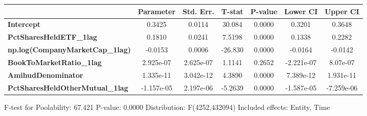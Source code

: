 \begin{center}
\begin{tabular}{lclc}
\bottomrule
\end{tabular}
\begin{tabular}{lcccccc}
                                        & \textbf{Parameter} & \textbf{Std. Err.} & \textbf{T-stat} & \textbf{P-value} & \textbf{Lower CI} & \textbf{Upper CI}  \\
\midrule
\textbf{Intercept}                      &       0.3425       &       0.0114       &      30.084     &      0.0000      &       0.3201      &       0.3648       \\
\textbf{PctSharesHeldETF\_1lag}         &       0.1810       &       0.0241       &      7.5198     &      0.0000      &       0.1338      &       0.2282       \\
\textbf{np.log(CompanyMarketCap\_1lag)} &      -0.0153       &       0.0006       &     -26.830     &      0.0000      &      -0.0164      &      -0.0142       \\
\textbf{BookToMarketRatio\_1lag}        &     2.925e-07      &     2.625e-07      &      1.1141     &      0.2652      &     -2.221e-07    &      8.07e-07      \\
\textbf{AmihudDenominator}              &     1.335e-11      &     3.042e-12      &      4.3890     &      0.0000      &     7.389e-12     &     1.931e-11      \\
\textbf{PctSharesHeldOtherMutual\_1lag} &     -1.157e-05     &     2.197e-06      &     -5.2639     &      0.0000      &     -1.587e-05    &     -7.259e-06     \\
\bottomrule
\end{tabular}
\end{center}

F-test for Poolability: 67.421 \newline
 P-value: 0.0000 \newline
 Distribution: F(4252,432094) \newline
  \newline
 Included effects: Entity, Time